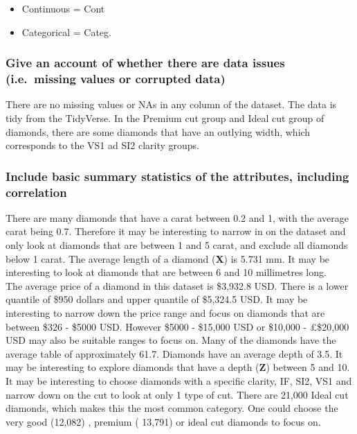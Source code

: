 \documentclass[
]{article}
\providecommand{\tightlist}{%
  \setlength{\itemsep}{0pt}\setlength{\parskip}{0pt}}
\begin{document}
\begin{itemize}
\tightlist
\item
  Continuous = Cont
\item
  Categorical = Categ.
\end{itemize}

\subsubsection{Give an account of whether there are data issues
(i.e.~missing values or corrupted
data)}\label{give-an-account-of-whether-there-are-data-issues-i.e.-missing-values-or-corrupted-data}

There are no missing values or NAs in any column of the dataset. The
data is tidy from the TidyVerse. In the Premium cut group and Ideal cut
group of diamonds, there are some diamonds that have an outlying width,
which corresponds to the VS1 ad SI2 clarity groups.

\subsubsection{Include basic summary statistics of the attributes,
including
correlation}\label{include-basic-summary-statistics-of-the-attributes-including-correlation}

There are many diamonds that have a carat between 0.2 and 1, with the
average carat being 0.7. Therefore it may be interesting to narrow in on
the dataset and only look at diamonds that are between 1 and 5 carat,
and exclude all diamonds below 1 carat. The average length of a diamond
(\textbf{X}) is 5.731 mm. It may be interesting to look at diamonds that
are between 6 and 10 millimetres long.\\
The average price of a diamond in this dataset is \$3,932.8 USD. There
is a lower quantile of \$950 dollars and upper quantile of \$5,324.5
USD. It may be interesting to narrow down the price range and focus on
diamonds that are between \$326 - \$5000 USD. However \$5000 - \$15,000
USD or \$10,000 - £\$20,000 USD may also be suitable ranges to focus on.
Many of the diamonds have the average table of approximately 61.7.
Diamonds have an average depth of 3.5. It may be interesting to explore
diamonds that have a depth (\textbf{Z}) between 5 and 10. It may be
interesting to choose diamonds with a specific clarity, IF, SI2, VS1 and
narrow down on the cut to look at only 1 type of cut. There are 21,000
Ideal cut diamonds, which makes this the most common category. One could
choose the very good (12,082) , premium ( 13,791) or ideal cut diamonds
to focus on.
\end{document}
